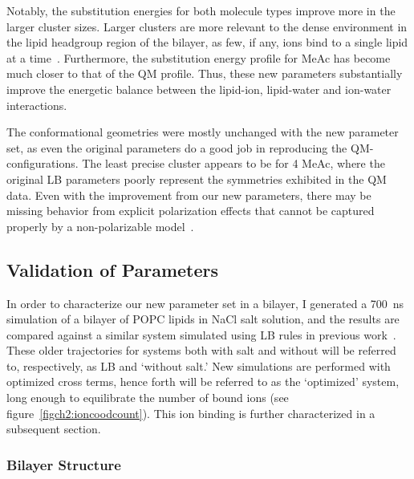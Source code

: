 Notably, the substitution energies for both molecule types improve more in the
larger cluster sizes. Larger clusters are more relevant to the dense
environment in the lipid headgroup region of the bilayer, 
as few, if any, ions bind to a single lipid at a time~\cite{kruczek:2017}. 
Furthermore, the substitution energy profile for MeAc has become much closer to that of the QM profile. 
Thus, these new parameters substantially improve the energetic balance
between the lipid-ion, lipid-water and ion-water interactions.

The conformational geometries were mostly unchanged with the new
parameter set, as even the original parameters do a good job in reproducing the QM-configurations. 
The least precise cluster appears to be for 4 MeAc, 
where the original LB parameters poorly represent the symmetries exhibited in the QM data. 
Even with the improvement from our new parameters, 
there may be missing behavior from explicit polarization effects that
cannot be captured properly by a non-polarizable model~\cite{varma:2010}.

\subsection{Validation of Parameters}

In order to characterize our new parameter set in a bilayer, 
I generated a 700~ns simulation of a bilayer of POPC lipids in NaCl salt solution, 
and the results are compared against a similar system simulated using
LB rules in previous work~\cite{kruczek:2017,kruczek:2019}. 
These older trajectories for systems both with salt and without will be referred to, 
respectively, as  LB and `without salt.'  
New simulations are performed with optimized cross terms, 
hence forth will be referred to as the `optimized' system, 
long enough to equilibrate the number of bound ions (see figure~\ref{figch2:ioncoodcount}). 
This ion binding is further characterized in a subsequent section.

\subsubsection{Bilayer Structure}

